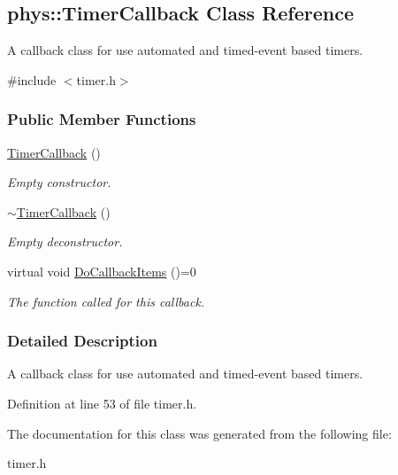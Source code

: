 \hypertarget{classphys_1_1TimerCallback}{
\subsection{phys::TimerCallback Class Reference}
\label{classphys_1_1TimerCallback}
}


A callback class for use automated and timed-\/event based timers.  




{\ttfamily \#include $<$timer.h$>$}

\subsubsection*{Public Member Functions}
\begin{DoxyCompactItemize}
\item 
\hypertarget{classphys_1_1TimerCallback_a8500d48fd294a0513a0a401423e2c122}{
\hyperlink{classphys_1_1TimerCallback_a8500d48fd294a0513a0a401423e2c122}{TimerCallback} ()}
\label{classphys_1_1TimerCallback_a8500d48fd294a0513a0a401423e2c122}

\begin{DoxyCompactList}\small\item\em Empty constructor. \item\end{DoxyCompactList}\item 
\hypertarget{classphys_1_1TimerCallback_a97422dd56db0f37f2b4103ba83f1da9b}{
\hyperlink{classphys_1_1TimerCallback_a97422dd56db0f37f2b4103ba83f1da9b}{$\sim$TimerCallback} ()}
\label{classphys_1_1TimerCallback_a97422dd56db0f37f2b4103ba83f1da9b}

\begin{DoxyCompactList}\small\item\em Empty deconstructor. \item\end{DoxyCompactList}\item 
\hypertarget{classphys_1_1TimerCallback_a8ceb51cd1b902e243e35cff61f4ae9d9}{
virtual void \hyperlink{classphys_1_1TimerCallback_a8ceb51cd1b902e243e35cff61f4ae9d9}{DoCallbackItems} ()=0}
\label{classphys_1_1TimerCallback_a8ceb51cd1b902e243e35cff61f4ae9d9}

\begin{DoxyCompactList}\small\item\em The function called for this callback. \item\end{DoxyCompactList}\end{DoxyCompactItemize}


\subsubsection{Detailed Description}
A callback class for use automated and timed-\/event based timers. 

Definition at line 53 of file timer.h.



The documentation for this class was generated from the following file:\begin{DoxyCompactItemize}
\item 
timer.h\end{DoxyCompactItemize}
